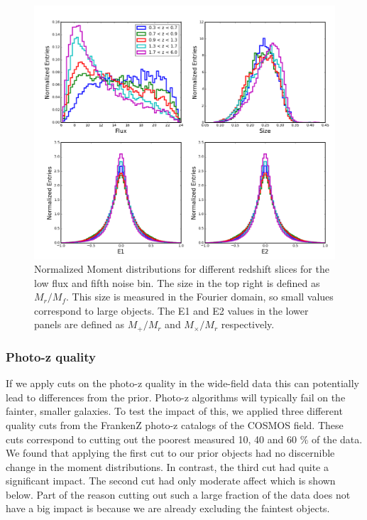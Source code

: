 \documentclass[useAMS,usenatbib]{mnras}
\begin{document}
\begin{figure}
    \includegraphics[width=\textwidth]{z_prior_moments.png}
    \caption{
       Normalized Moment distributions for different redshift slices for the low flux and fifth noise bin.  The size in the top right is defined as $M_r/M_f$.  This size is measured in the Fourier domain, so small values correspond to large objects.  The E1 and E2 values in the lower panels are defined as $M_+/M_r$ and $M_\times/M_r$ respectively.
    }
    \label{fig:z_prior_moments}
\end{figure}

\subsubsection{Photo-z quality}

If we apply cuts on the photo-z quality in the wide-field data this can potentially lead to differences from the prior.  Photo-z algorithms will typically fail on the fainter, smaller galaxies.  To test the impact of this, we applied three different quality cuts from the FrankenZ photo-z catalogs of the COSMOS field.  These cuts correspond to cutting out the poorest measured 10, 40 and 60 $\%$ of the data.   We found that applying the first cut to our prior objects had no discernible change in the moment distributions.  In contrast, the third cut had quite a significant impact.  The second cut had only moderate affect which is shown below.  Part of the reason cutting out such a large fraction of the data does not have a big impact is because we are already excluding the faintest objects.
\end{document}

